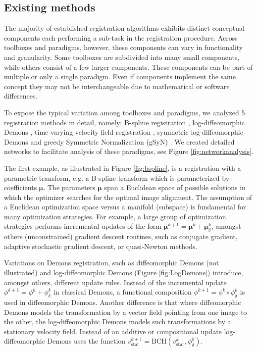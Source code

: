 \subsection{Existing methods}

The majority of established registration algorithms exhibits distinct
conceptual components each performing a sub-task in the registration
procedure. Across toolboxes and paradigms, however, these components
can vary in functionality and granularity. Some toolboxes are
subdivided into many small components, while others consist of a few
larger components. These components can be part of multiple or only
a single paradigm. Even if components implement the same concept
they may not be interchangeable due to mathematical or software
differences.

To expose the typical variation among toolboxes and paradigms, we
analyzed 5 registration methods in detail, namely: B-spline
registration \cite{elastix}, log-diffeomorphic Demons \cite{Ashburner:Dartel}, time varying velocity field
registration \cite{Tustison:BSSyN}, symmetric log-diffeomorphic Demons \cite{Vercauteren:SymLogDemons} and greedy
Symmetric Normalization (gSyN) \cite{Avants:SyN}.
We created detailed networks to facilitate analysis of these
paradigms, see Figure \ref{fig:networkanalysis}.

The first example, as illustrated in Figure \ref{fig:bspline}, is a
registration with a parametric transform, e.g. a B-spline transform
which is parameterized by coefficients $\bm{\mu}$.
The parameters $\bm{\mu}$ span a Euclidean space of possible
solutions in which the optimizer searches for the optimal image
alignment. The assumption of a Euclidean optimization space versus a
manifold (subspace) is fundamental for many optimization strategies.
For example, a large group of optimization strategies performs
incremental updates of the form $\bm{\mu}^{k+1} = \bm{\mu}^k +
\bm{\mu}_\delta^k$, amongst others (unconstrained) gradient descent
routines, such as conjugate gradient, adaptive stochastic gradient
descent, or quasi-Newton methods.

Variations on Demons registration, such as diffeomorphic Demons (not
illustrated) and log-diffeomorphic Demons \cite{Dru:LogDemons}
(Figure \ref{fig:LogDemons}) introduce, amongst others, different
update rules. Instead of the incremental update $\phi^{k+1} = \phi^k
+ \phi_\delta^k$ in classical Demons, a functional composition
$\phi^{k+1} = \phi^k \circ \phi_\delta^k$ is used in diffeomorphic
Demons. Another difference is that where diffeomorphic Demons models
the transformation by a vector field pointing from one image to the
other, the log-diffeomorphic Demons models such transformations by a
stationary velocity field. Instead of an additive or compositional
update log-diffeomorphic Demons uses the function
$v_\mathrm{stat}^{k+1} = \mathrm{BCH}\left(v_\mathrm{stat}^{k},
\phi_\delta^k\right)$. 

